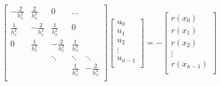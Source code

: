 \documentclass[11pt, letterpaper, hidelinks]{article}
\theoremstyle{definition}
\begin{document}
\begin{align*}
    \left[
        \begin{array}{ccccc}
            -\frac{2}{h_x^2} & \frac{2}{h_x^2}  & 0                & ...             &                  \\
            \frac{1}{h_x^2}  & -\frac{2}{h_x^2} & \frac{1}{h_x^2}  & 0               &                  \\
            0                & \frac{1}{h_x^2}  & -\frac{2}{h_x^2} & \frac{1}{h_x^2} &                  \\
                             &                  & \ddots           & \ddots          & \ddots           \\
                             &                  &                  & \frac{1}{h_x^2} & -\frac{2}{h_x^2} \\
        \end{array}
        \right]
    \left[
        \begin{array}{ccccc}
            u_0 \\ u_1 \\ u_2 \\ \vdots \\ u_{n-1}  \\
        \end{array}
        \right]
    = -
    \left[
        \begin{array}{ccccc}
            r(x_0) \\ r(x_1) \\ r(x_2) \\ \vdots \\ r(x_{n-1})  \\
        \end{array}
        \right]
\end{align*}
\end{document}
